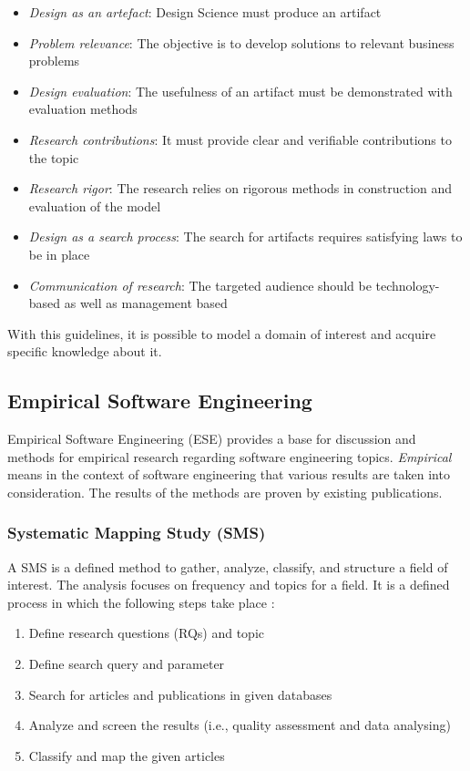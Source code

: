 \begin{itemize}
    \item \textit{Design as an artefact}: Design Science must produce an artifact
    \item \textit{Problem relevance}: The objective is to develop solutions to relevant business problems
    \item \textit{Design evaluation}: The usefulness of an artifact must be demonstrated with evaluation methods
    \item \textit{Research contributions}: It must provide clear and verifiable contributions to the topic
    \item \textit{Research rigor}: The research relies on rigorous methods in construction and evaluation of the model
    \item \textit{Design as a search process}: The search for artifacts requires satisfying laws to be in place
    \item \textit{Communication of research}: The targeted audience should be technology-based as well as management based
\end{itemize}

With this guidelines, it is possible to model a domain of interest and acquire
specific knowledge about it.

\subsection{Empirical Software Engineering}

Empirical Software Engineering (ESE) provides a base for discussion and methods for empirical
research regarding software engineering topics. \textit{Empirical} means in the context
of software engineering that various results are taken into consideration. The results
of the methods are proven by existing publications.

\subsubsection{Systematic Mapping Study (SMS)}

A SMS is a defined method to gather, analyze, classify, and structure a field of interest.
The analysis focuses on frequency and topics for a
field. It is a defined process in which the following steps take place \cite{petersen:SMS}:

\begin{enumerate}
    \item Define research questions (RQs) and topic
    \item Define search query and parameter
    \item Search for articles and publications in given databases
    \item Analyze and screen the results (i.e., quality assessment and data analysing)
    \item Classify and map the given articles
\end{enumerate}


